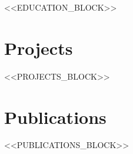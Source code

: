 \documentclass[10.9pt, letterpaper]{article}
\begin{document}
{\small
<<EDUCATION_BLOCK>>
}

\vspace{-0.1em}

\section{Projects}

{\small
<<PROJECTS_BLOCK>>
}

\vspace{-0.1em}

\section{Publications}

{\small
<<PUBLICATIONS_BLOCK>>
}
\end{document}

